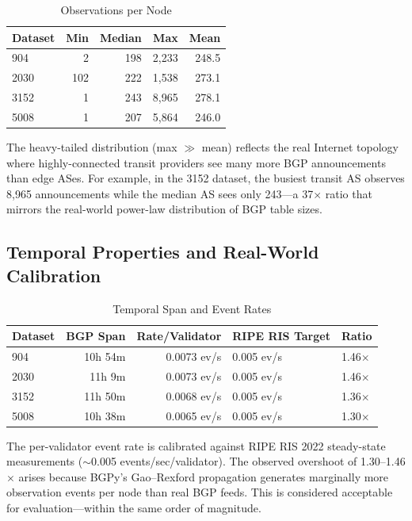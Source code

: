 \documentclass[11pt,a4paper]{article}
\begin{document}
\begin{table}[H]
\centering
\caption{Observations per Node}
\begin{tabular}{lrrrr}
\toprule
\textbf{Dataset} & \textbf{Min} & \textbf{Median} & \textbf{Max} & \textbf{Mean} \\
\midrule
904   & 2   & 198 & 2,233 & 248.5 \\
2030  & 102 & 222 & 1,538 & 273.1 \\
3152  & 1   & 243 & 8,965 & 278.1 \\
5008  & 1   & 207 & 5,864 & 246.0 \\
\bottomrule
\end{tabular}
\end{table}

The heavy-tailed distribution (max $\gg$ mean) reflects the real Internet topology
where highly-connected transit providers see many more BGP announcements than
edge ASes. For example, in the 3152 dataset, the busiest transit AS observes
8,965 announcements while the median AS sees only 243---a 37$\times$ ratio that
mirrors the real-world power-law distribution of BGP table sizes.

\subsection{Temporal Properties and Real-World Calibration}

\begin{table}[H]
\centering
\caption{Temporal Span and Event Rates}
\begin{tabular}{lrrll}
\toprule
\textbf{Dataset} & \textbf{BGP Span} & \textbf{Rate/Validator} & \textbf{RIPE RIS Target} & \textbf{Ratio} \\
\midrule
904   & 10h 54m & 0.0073 ev/s & 0.005 ev/s & 1.46$\times$ \\
2030  & 11h  9m & 0.0073 ev/s & 0.005 ev/s & 1.46$\times$ \\
3152  & 11h 50m & 0.0068 ev/s & 0.005 ev/s & 1.36$\times$ \\
5008  & 10h 38m & 0.0065 ev/s & 0.005 ev/s & 1.30$\times$ \\
\bottomrule
\end{tabular}
\end{table}

The per-validator event rate is calibrated against RIPE RIS 2022 steady-state
measurements ($\sim$0.005 events/sec/validator). The observed overshoot of
1.30--1.46$\times$ arises because BGPy's Gao--Rexford propagation generates
marginally more observation events per node than real BGP feeds. This is
considered acceptable for evaluation---within the same order of magnitude.
\end{document}
